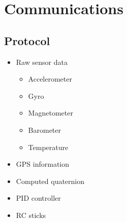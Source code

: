 \section{Communications}

\subsection{Protocol}
\begin{itemize}
\item Raw sensor data
\begin{itemize}
\item Accelerometer
\item Gyro
\item Magnetometer
\item Barometer
\item Temperature
\end{itemize}
\item GPS information
\item Computed quaternion
\item PID controller
\item RC sticks
\end{itemize}